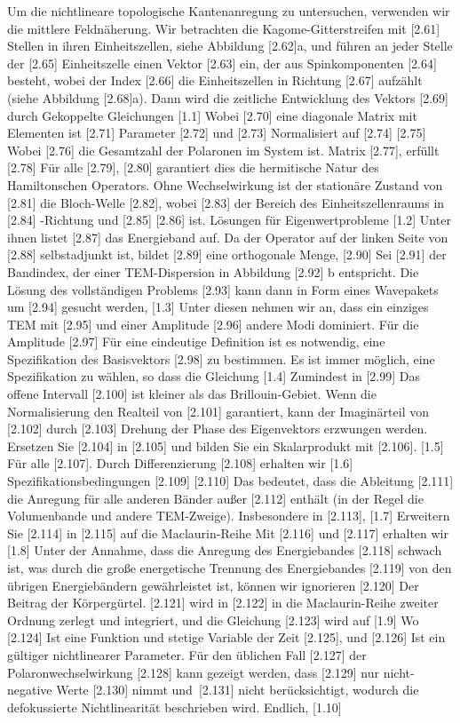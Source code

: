 \documentclass[
aps,
prl,
groupedaddress,
superscriptaddress,
floatfix,
notitlepage
]{revtex4-1}
\begin{document}
Um die nichtlineare topologische Kantenanregung zu untersuchen, verwenden wir die mittlere Feldnäherung. Wir betrachten die Kagome-Gitterstreifen mit [2.61] Stellen in ihren Einheitszellen, siehe Abbildung [2.62]a, und führen an jeder Stelle der [2.65] Einheitszelle einen Vektor [2.63] ein, der aus Spinkomponenten [2.64] besteht, wobei der Index [2.66] die Einheitszellen in Richtung [2.67] aufzählt (siehe Abbildung [2.68]a).
Dann wird die zeitliche Entwicklung des Vektors [2.69] durch
Gekoppelte Gleichungen
[1.1]
Wobei [2.70] eine diagonale Matrix mit Elementen ist
[2.71]
Parameter [2.72] und
[2.73] Normalisiert auf [2.74]
[2.75]
Wobei [2.76] die Gesamtzahl der Polaronen im System ist.
Matrix [2.77], erfüllt [2.78]
Für alle [2.79], [2.80] garantiert dies die hermitische Natur des Hamiltonschen Operators.
Ohne Wechselwirkung ist der stationäre Zustand von [2.81] die Bloch-Welle [2.82], wobei [2.83] der Bereich des Einheitszellenraums in [2.84] -Richtung und [2.85] [2.86] ist.
Lösungen für Eigenwertprobleme
[1.2]
Unter ihnen listet [2.87] das Energieband auf. Da der Operator auf der linken Seite von [2.88] selbstadjunkt ist, bildet [2.89] eine orthogonale Menge,
[2.90]
Sei [2.91] der Bandindex, der einer TEM-Dispersion in Abbildung [2.92] b entspricht.
Die Lösung des vollständigen Problems [2.93] kann dann in Form eines Wavepakets um [2.94] gesucht werden,
[1.3]
Unter diesen nehmen wir an, dass ein einziges TEM mit [2.95] und einer Amplitude [2.96] andere Modi dominiert.
Für die Amplitude [2.97]
Für eine eindeutige Definition ist es notwendig, eine Spezifikation des Basisvektors [2.98] zu bestimmen. Es ist immer möglich, eine Spezifikation zu wählen, so dass die Gleichung
[1.4]
Zumindest in
[2.99]
Das offene Intervall [2.100] ist kleiner als das Brillouin-Gebiet. Wenn die Normalisierung den Realteil von [2.101] garantiert, kann der Imaginärteil von [2.102] durch [2.103] Drehung der Phase des Eigenvektors erzwungen werden.
Ersetzen Sie [2.104] in [2.105] und bilden Sie ein Skalarprodukt mit [2.106].
[1.5]
Für alle [2.107].
Durch Differenzierung [2.108] erhalten wir
[1.6]
Spezifikationsbedingungen [2.109]
[2.110]
Das bedeutet, dass die Ableitung [2.111] die Anregung für alle anderen Bänder außer [2.112] enthält (in der Regel die Volumenbande und andere TEM-Zweige). Insbesondere in [2.113],
[1.7]
Erweitern Sie [2.114] in [2.115] auf die Maclaurin-Reihe
Mit [2.116] und [2.117] erhalten wir
[1.8]
Unter der Annahme, dass die Anregung des Energiebandes [2.118] schwach ist, was durch die große energetische Trennung des Energiebandes [2.119] von den übrigen Energiebändern gewährleistet ist, können wir ignorieren
[2.120] Der Beitrag der Körpergürtel.
[2.121] wird in [2.122] in die Maclaurin-Reihe zweiter Ordnung zerlegt und integriert, und die Gleichung [2.123] wird auf
[1.9]
Wo
[2.124]
Ist eine Funktion und stetige Variable der Zeit [2.125], und
[2.126]
Ist ein gültiger nichtlinearer Parameter. Für den üblichen Fall [2.127] der Polaronwechselwirkung [2.128] kann gezeigt werden, dass [2.129] nur nicht-negative Werte [2.130] nimmt und~[2.131] nicht berücksichtigt, wodurch die defokussierte Nichtlinearität beschrieben wird.
Endlich,
[1.10]
\end{document}
